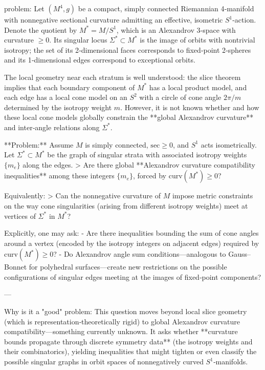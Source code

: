 problem:  
Let \( (M^4,g) \) be a compact, simply connected Riemannian 4‑manifold with nonnegative sectional curvature admitting an effective, isometric \(S^1\)-action. Denote the quotient by \(M^* = M / S^1\), which is an Alexandrov 3‑space with curvature \(\ge 0\). Its singular locus \(\Sigma^*\subset M^*\) is the image of orbits with nontrivial isotropy; the set of its 2‑dimensional faces corresponds to fixed‑point 2‑spheres and its 1‑dimensional edges correspond to exceptional orbits.  

The local geometry near each stratum is well understood: the slice theorem implies that each boundary component of \(M^*\) has a local product model, and each edge has a local cone model on an \(S^2\) with a circle of cone angle \(2\pi/m\) determined by the isotropy weight \(m\).  However, it is not known whether and how these local cone models globally constrain the **global Alexandrov curvature** and inter‑angle relations along \(\Sigma^*\).  

**Problem:**  
Assume \(M\) is simply connected, \(\mathrm{sec}\ge0\), and \(S^1\) acts isometrically.  Let \(\Sigma^*\subset M^*\) be the graph of singular strata with associated isotropy weights \(\{m_e\}\) along the edges.  
> Are there global **Alexandrov curvature compatibility inequalities** among these integers \(\{m_e\}\), forced by \(\mathrm{curv}(M^*)\ge 0\)?  

Equivalently:  
> Can the nonnegative curvature of \(M\) impose metric constraints on the way cone singularities (arising from different isotropy weights) meet at vertices of \(\Sigma^*\) in \(M^*\)?  

Explicitly, one may ask:
- Are there inequalities bounding the sum of cone angles around a vertex (encoded by the isotropy integers on adjacent edges) required by \(\mathrm{curv}(M^*)\ge0\)?  
- Do Alexandrov angle sum conditions—analogous to Gauss–Bonnet for polyhedral surfaces—create new restrictions on the possible configurations of singular edges meeting at the images of fixed‑point components?

---

Why is it a "good" problem:  
This question moves beyond local slice geometry (which is representation‑theoretically rigid) to global Alexandrov curvature compatibility—something currently unknown.  It asks whether **curvature bounds propagate through discrete symmetry data** (the isotropy weights and their combinatorics), yielding inequalities that might tighten or even classify the possible singular graphs in orbit spaces of nonnegatively curved \(S^1\)‑manifolds.

